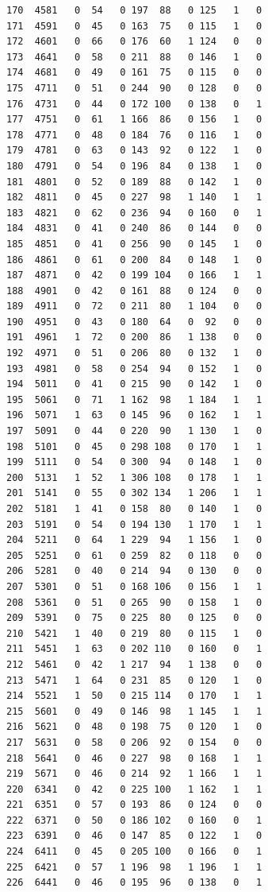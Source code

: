 \documentclass[
  letterpaper,
]{scrbook}
\begin{document}
\begin{verbatim}
170  4581   0  54   0 197  88   0 125   1   0
171  4591   0  45   0 163  75   0 115   1   0
172  4601   0  66   0 176  60   1 124   0   0
173  4641   0  58   0 211  88   0 146   1   0
174  4681   0  49   0 161  75   0 115   0   0
175  4711   0  51   0 244  90   0 128   0   0
176  4731   0  44   0 172 100   0 138   0   1
177  4751   0  61   1 166  86   0 156   1   0
178  4771   0  48   0 184  76   0 116   1   0
179  4781   0  63   0 143  92   0 122   1   0
180  4791   0  54   0 196  84   0 138   1   0
181  4801   0  52   0 189  88   0 142   1   0
182  4811   0  45   0 227  98   1 140   1   1
183  4821   0  62   0 236  94   0 160   0   1
184  4831   0  41   0 240  86   0 144   0   0
185  4851   0  41   0 256  90   0 145   1   0
186  4861   0  61   0 200  84   0 148   1   0
187  4871   0  42   0 199 104   0 166   1   1
188  4901   0  42   0 161  88   0 124   0   0
189  4911   0  72   0 211  80   1 104   0   0
190  4951   0  43   0 180  64   0  92   0   0
191  4961   1  72   0 200  86   1 138   0   0
192  4971   0  51   0 206  80   0 132   1   0
193  4981   0  58   0 254  94   0 152   1   0
194  5011   0  41   0 215  90   0 142   1   0
195  5061   0  71   1 162  98   1 184   1   1
196  5071   1  63   0 145  96   0 162   1   1
197  5091   0  44   0 220  90   1 130   1   0
198  5101   0  45   0 298 108   0 170   1   1
199  5111   0  54   0 300  94   0 148   1   0
200  5131   1  52   1 306 108   0 178   1   1
201  5141   0  55   0 302 134   1 206   1   1
202  5181   1  41   0 158  80   0 140   1   0
203  5191   0  54   0 194 130   1 170   1   1
204  5211   0  64   1 229  94   1 156   1   0
205  5251   0  61   0 259  82   0 118   0   0
206  5281   0  40   0 214  94   0 130   0   0
207  5301   0  51   0 168 106   0 156   1   1
208  5361   0  51   0 265  90   0 158   1   0
209  5391   0  75   0 225  80   0 125   0   0
210  5421   1  40   0 219  80   0 115   1   0
211  5451   1  63   0 202 110   0 160   0   1
212  5461   0  42   1 217  94   1 138   0   0
213  5471   1  64   0 231  85   0 120   1   0
214  5521   1  50   0 215 114   0 170   1   1
215  5601   0  49   0 146  98   1 145   1   1
216  5621   0  48   0 198  75   0 120   1   0
217  5631   0  58   0 206  92   0 154   0   0
218  5641   0  46   0 227  98   0 168   1   1
219  5671   0  46   0 214  92   1 166   1   1
220  6341   0  42   0 225 100   1 162   1   1
221  6351   0  57   0 193  86   0 124   0   0
222  6371   0  50   0 186 102   0 160   0   1
223  6391   0  46   0 147  85   0 122   1   0
224  6411   0  45   0 205 100   0 166   0   1
225  6421   0  57   1 196  98   1 196   1   1
226  6441   0  46   0 195  96   0 138   0   1

\end{verbatim}
\end{document}
